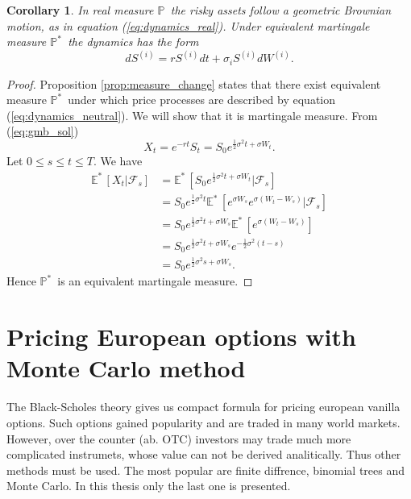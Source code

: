 \documentclass[a4paper,12pt, oneside]{book}
\newtheorem{coro}[thm]{Corollary}
\theoremstyle{definition}
\theoremstyle{remark}
\def\P{{\mathbb{P}}\,}
\def\Em{{\mathbb{E}^*}\,}
\def\Pm{{\mathbb{P}}^*\,}
\begin{document}
\begin{coro}
\label{coro:rn-dynamics}
 In real measure $\P$ the risky assets follow a geometric Brownian motion, as in equation (\ref{eq:dynamics_real}). Under equivalent martingale measure $\Pm$ the dynamics has the form
 \begin{equation}
  \label{eq:dynamics_neutral}
  dS^{(i)} = r S^{(i)} dt + \sigma_i S^{(i)} dW^{(i)}.
 \end{equation}
\end{coro}
\begin{proof}
 Proposition \ref{prop:measure_change} states that there exist equivalent measure $\Pm$ under which price processes are described by equation (\ref{eq:dynamics_neutral}). We will show that it is martingale measure.
 From (\ref{eq:gmb_sol})
 \[ X_t = e^{-rt} S_t = S_0 e^{ \frac{1}{2}\sigma^2 t + \sigma W_t }. \]
 Let $0 \leq s \leq t \leq T$. We have
 \begin{equation*}
  \begin{split}
   \Em[X_t | \mathcal{F}_s] &= \Em[ S_0 e^{ \frac{1}{2}\sigma^2 t + \sigma W_t } | \mathcal{F}_s] \\
       &= S_0 e^{\frac{1}{2}\sigma^2 t} \Em[ e^{  \sigma W_s} e^{ \sigma (W_t - W_s) } | \mathcal{F}_s] \\
       &= S_0 e^{\frac{1}{2}\sigma^2 t + \sigma W_s} \Em[ e^{ \sigma (W_t - W_s) }] \\
       &= S_0 e^{\frac{1}{2}\sigma^2 t + \sigma W_s}  e^{ -\frac{1}{2}\sigma^2(t-s) } \\
       &= S_0 e^{\frac{1}{2}\sigma^2 s + \sigma W_s}.
  \end{split}
 \end{equation*}
Hence $\Pm$ is an equivalent martingale measure.
\end{proof}


\chapter[{Pricing European options with Monte Carlo method}]{Pricing European options with \\Monte Carlo method}
The Black-Scholes theory gives us compact formula for pricing european vanilla options. Such options gained popularity and are traded in many world markets. However, over the counter (ab. OTC) investors may trade much more complicated instrumets, whose value can not be derived analitically. Thus other methods must be used. The most popular are finite diffrence, binomial trees and Monte Carlo. In this thesis only the last one is presented.
\end{document}
